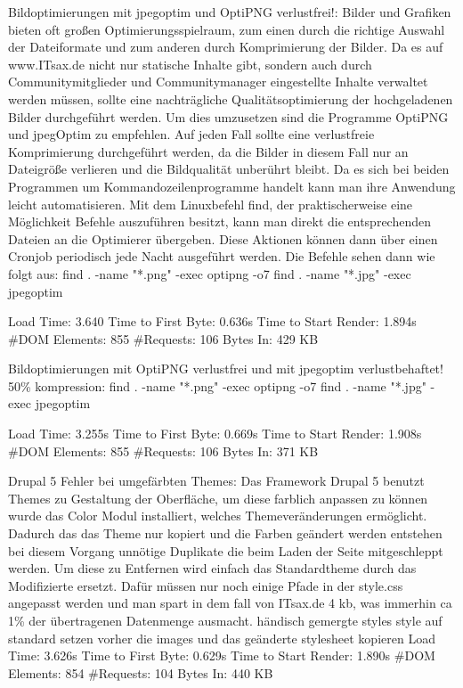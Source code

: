 Bildoptimierungen mit jpegoptim und OptiPNG verlustfrei!: 
Bilder und Grafiken bieten oft großen Optimierungsspielraum, zum einen durch die richtige Auswahl der Dateiformate und zum anderen durch Komprimierung der Bilder. Da es auf www.ITsax.de nicht nur statische Inhalte gibt, sondern auch durch Communitymitglieder und Communitymanager eingestellte Inhalte verwaltet werden müssen, sollte eine nachträgliche Qualitätsoptimierung der hochgeladenen Bilder durchgeführt werden. Um dies umzusetzen sind die Programme OptiPNG und jpegOptim zu empfehlen. Auf jeden Fall sollte eine verlustfreie Komprimierung durchgeführt werden, da die Bilder in diesem Fall nur an Dateigröße verlieren und die Bildqualität unberührt bleibt. Da es sich bei beiden Programmen um Kommandozeilenprogramme handelt kann man ihre Anwendung leicht automatisieren. Mit dem Linuxbefehl find, der praktischerweise eine Möglichkeit Befehle auszuführen besitzt, kann man direkt die entsprechenden Dateien an die Optimierer übergeben. Diese Aktionen können dann über einen Cronjob periodisch jede Nacht ausgeführt werden. Die Befehle sehen dann wie folgt aus: 
find . -name "*.png" -exec optipng -o7 {} \;
find . -name "*.jpg" -exec jpegoptim {} \;


Load Time: 3.640
Time to First Byte: 0.636s %
Time to Start Render: 1.894s
\#DOM Elements: 855 	
\#Requests: 106 %
Bytes In: 429 KB %

Bildoptimierungen mit OptiPNG verlustfrei und mit jpegoptim verlustbehaftet! 50\% kompression:
find . -name "*.png" -exec optipng -o7 {} \;
find . -name "*.jpg" -exec jpegoptim {} \;

Load Time: 3.255s
Time to First Byte: 0.669s %
Time to Start Render: 1.908s
\#DOM Elements: 855 	
\#Requests: 106 %
Bytes In: 371 KB %

Drupal 5 Fehler bei umgefärbten Themes:
Das Framework Drupal 5 benutzt Themes zu Gestaltung der Oberfläche, um diese farblich anpassen zu können wurde das Color Modul installiert, welches Themeveränderungen ermöglicht. Dadurch das das Theme nur kopiert und die Farben geändert werden entstehen bei diesem Vorgang unnötige Duplikate die beim Laden der Seite mitgeschleppt werden. Um diese zu Entfernen wird einfach das Standardtheme durch das Modifizierte ersetzt. Dafür müssen  nur noch einige Pfade in der style.css angepasst werden und man spart in dem fall von ITsax.de 4 kb, was immerhin ca 1\% der übertragenen Datenmenge ausmacht.
händisch gemergte styles
style auf standard setzen
vorher die images und das geänderte stylesheet kopieren
Load Time: 3.626s
Time to First Byte: 0.629s %
Time to Start Render: 1.890s
\#DOM Elements: 854 	
\#Requests: 104 %
Bytes In: 440 KB %

